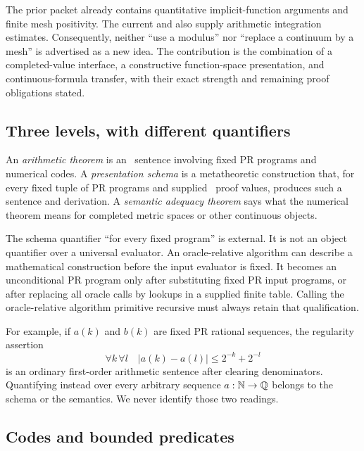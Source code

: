 The prior  packet already contains quantitative implicit-function arguments and finite mesh positivity. The current  and  also supply arithmetic integration estimates. Consequently, neither ``use a modulus'' nor ``replace a continuum by a mesh'' is advertised as a new idea. The contribution is the combination of a completed-value interface, a constructive function-space presentation, and continuous-formula transfer, with their exact strength and remaining proof obligations stated.

\subsection{Three levels, with different quantifiers}

\begin{definition}\label{def:levels}
An \emph{arithmetic theorem} is an \ipra\ sentence involving fixed PR programs and numerical codes. A \emph{presentation schema} is a metatheoretic construction that, for every fixed tuple of PR programs and supplied \ipra\ proof values, produces such a sentence and derivation. A \emph{semantic adequacy theorem} says what the numerical theorem means for completed metric spaces or other continuous objects.
\end{definition}

The schema quantifier ``for every fixed program'' is external. It is not an object quantifier over a universal evaluator. An oracle-relative algorithm can describe a mathematical construction before the input evaluator is fixed. It becomes an unconditional PR program only after substituting fixed PR input programs, or after replacing all oracle calls by lookups in a supplied finite table. Calling the oracle-relative algorithm primitive recursive must always retain that qualification.

For example, if \(a(k)\) and \(b(k)\) are fixed PR rational sequences, the regularity assertion
\[
 \forall k\,\forall l\quad |a(k)-a(l)|\leq 2^{-k}+2^{-l}
\]
is an ordinary first-order arithmetic sentence after clearing denominators. Quantifying instead over every arbitrary sequence \(a:\mathbb N\to\mathbb Q\) belongs to the schema or the semantics. We never identify those two readings.

\subsection{Codes and bounded predicates}

